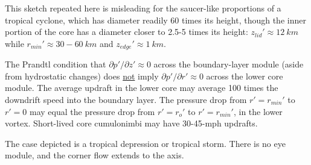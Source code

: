 \documentclass[preprint, prX]{revtex4}
\newcommand{\vpd}[2]{\partial#1 / \partial#2}
\newcommand{\rmin}{r_{min}}
\newcommand{\zedge}{z_{edge}}
\begin{document}
This sketch repeated here is misleading for the saucer-like proportions of a tropical cyclone, which has diameter readily 60 times its height, though the inner portion of the core has a diameter closer to 2.5-5 times its height:
$z_{lid}' \approx 12\ \si{km}$ while $\rmin' \approx 30-60\ \si{km}$ and $\zedge' \approx 1\ \si{km}$.

The Prandtl condition that $\vpd{p'}{z'} \approx	0$ across the boundary-layer module (aside from hydrostatic changes) does \underline{not} imply $\vpd{p'}{r'} \approx 0$ across the lower core module. The average updraft in the lower core may average 100 times the downdrift speed into the boundary layer. The pressure drop from $r'=\rmin'$ to $r'=0$ may equal the pressure drop from $r'=r_o'$ to $r'=\rmin'$, in the lower vortex. Short-lived core cumulonimbi may have 30-45-mph updrafts.

The case depicted is a tropical depression or tropical storm. There is no eye module, and the corner flow extends to the axis.
\end{document}

